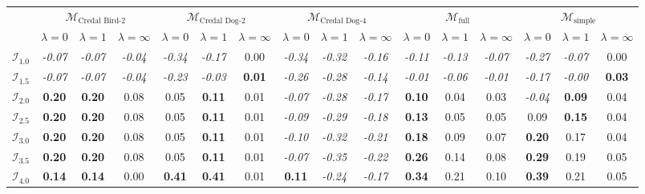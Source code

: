\begin{tabular}{|c|ccc|ccc|ccc|ccc|ccc|}
\toprule
\hline
 & \multicolumn{3}{c|}{$\mathcal{M}_{\text{Credal Bird-2}}$} & \multicolumn{3}{c|}{$\mathcal{M}_{\text{Credal Dog-2}}$} & \multicolumn{3}{c|}{$\mathcal{M}_{\text{Credal Dog-4}}$} & \multicolumn{3}{c|}{$\mathcal{M}_{\text{full}}$} & \multicolumn{3}{c|}{$\mathcal{M}_{\text{simple}}$} \\
 & $\lambda = 0$ & $\lambda = 1$ & $\lambda = \infty$ & $\lambda = 0$ & $\lambda = 1$ & $\lambda = \infty$ & $\lambda = 0$ & $\lambda = 1$ & $\lambda = \infty$ & $\lambda = 0$ & $\lambda = 1$ & $\lambda = \infty$ & $\lambda = 0$ & $\lambda = 1$ & $\lambda = \infty$ \\
\hline
\midrule
$\mathcal{I}_{1.0}$ & \textit{-0.07} & \textit{-0.07} & \textit{-0.04} & \textit{-0.34} & \textit{-0.17} & 0.00 & \textit{-0.34} & \textit{-0.32} & \textit{-0.16} & \textit{-0.11} & \textit{-0.13} & \textit{-0.07} & \textit{-0.27} & \textit{-0.07} & 0.00 \\
$\mathcal{I}_{1.5}$ & \textit{-0.07} & \textit{-0.07} & \textit{-0.04} & \textit{-0.23} & \textit{-0.03} & \textbf{0.01} & \textit{-0.26} & \textit{-0.28} & \textit{-0.14} & \textit{-0.01} & \textit{-0.06} & \textit{-0.01} & \textit{-0.17} & \textit{-0.00} & \textbf{0.03} \\
$\mathcal{I}_{2.0}$ & \textbf{0.20} & \textbf{0.20} & 0.08 & 0.05 & \textbf{0.11} & 0.01 & \textit{-0.07} & \textit{-0.28} & \textit{-0.17} & \textbf{0.10} & 0.04 & 0.03 & \textit{-0.04} & \textbf{0.09} & 0.04 \\
$\mathcal{I}_{2.5}$ & \textbf{0.20} & \textbf{0.20} & 0.08 & 0.05 & \textbf{0.11} & 0.01 & \textit{-0.09} & \textit{-0.29} & \textit{-0.18} & \textbf{0.13} & 0.05 & 0.05 & 0.09 & \textbf{0.15} & 0.04 \\
$\mathcal{I}_{3.0}$ & \textbf{0.20} & \textbf{0.20} & 0.08 & 0.05 & \textbf{0.11} & 0.01 & \textit{-0.10} & \textit{-0.32} & \textit{-0.21} & \textbf{0.18} & 0.09 & 0.07 & \textbf{0.20} & 0.17 & 0.04 \\
$\mathcal{I}_{3.5}$ & \textbf{0.20} & \textbf{0.20} & 0.08 & 0.05 & \textbf{0.11} & 0.01 & \textit{-0.07} & \textit{-0.35} & \textit{-0.22} & \textbf{0.26} & 0.14 & 0.08 & \textbf{0.29} & 0.19 & 0.05 \\
$\mathcal{I}_{4.0}$ & \textbf{0.14} & \textbf{0.14} & 0.00 & \textbf{0.41} & \textbf{0.41} & 0.01 & \textbf{0.11} & \textit{-0.24} & \textit{-0.17} & \textbf{0.34} & 0.21 & 0.10 & \textbf{0.39} & 0.21 & 0.05 \\
\hline
\bottomrule
\end{tabular}
